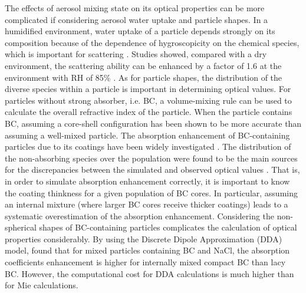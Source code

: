 \documentclass[edeposit,fullpage]{uiucthesis2009}
\newcommand{\jcedits}[1]{{\color{blue} #1}}
\begin{document}
The effects of aerosol mixing state on its optical properties can be
more complicated if considering aerosol water uptake and particle
shapes. In a humidified environment, water \jcedits{uptake} of a particle
depends strongly on its composition because of the dependence of
hygroscopicity on the chemical species, which is important for
scattering \citep{MichelFlores2012, Zieger2013, Titos2014,
  Titos2016}. Studies showed, compared with a dry environment, the
scattering ability can be enhanced by a factor of 1.6 at the
environment with RH of 85\% \citep{Burgos2020}. As for particle
shapes, the distribution of the diverse species {\rm within} a
particle is important in determining optical values. For particles
without strong absorber, i.e. BC, a volume-mixing rule can be used to
calculate the overall refractive index of the particle. When the
particle contains BC, assuming a core-shell configuration has been
shown to be more accurate \citep{Bond2006} than assuming a well-mixed
particle. The absorption enhancement of BC-containing particles due to
its coatings have been widely investigated \citep{Moffet2009,Liu2017,
  wu2020light}. The distribution of the non-absorbing species over the
population were found to be the main sources for the discrepancies
between the simulated and observed optical values \citep{Fierce2016,
  Fierce2020}. That is, in order to simulate absorption enhancement
correctly, it is important to know the coating thinkness for a given
population of BC cores. In particular, assuming an internal mixture
(where larger BC cores receive thicker coatings) leads to a systematic
overestimation of the absorption enhancement. Considering the
non-spherical shapes of BC-containing particles complicates the
calculation of optical properties considerably. By using the Discrete
Dipole Approximation (DDA) model, \citet{scarnato2013effects} found
that for mixed particles containing BC and NaCl, the absorption
coefficients enhancement is higher for internally mixed compact BC
than lacy BC. However, the computational cost for DDA calculations is
much higher than for Mie calculations.
\end{document}
